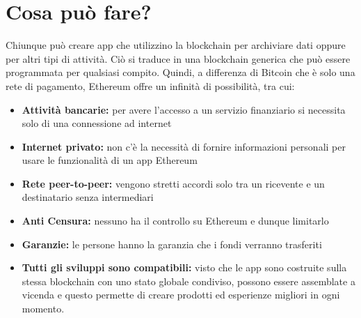 \documentclass[a4paper,11pt]{report}
\begin{document}
\section{Cosa può fare?}
Chiunque può creare app che utilizzino la blockchain per archiviare dati oppure per altri tipi di attività. Ciò si traduce in una blockchain generica che può essere programmata per qualsiasi compito. Quindi, a differenza di Bitcoin che è solo una rete di pagamento, Ethereum offre un infinità di possibilità, tra cui: 
\begin{itemize} %
\item \textbf{Attività bancarie:} per avere l'accesso a un servizio finanziario si necessita solo di una connessione ad internet
\item \textbf{Internet privato:} non c'è la necessità di fornire informazioni personali per usare le funzionalità di un app Ethereum
\item \textbf{Rete peer-to-peer:} vengono stretti accordi solo tra un ricevente e un destinatario senza intermediari
\item \textbf{Anti Censura:} nessuno ha il controllo su Ethereum e dunque limitarlo
\item \textbf{Garanzie:} le persone hanno la garanzia che i fondi verranno trasferiti
\item \textbf{Tutti gli sviluppi sono compatibili:} visto che le app sono costruite sulla stessa blockchain con uno stato globale condiviso, possono essere assemblate a vicenda e questo permette di creare prodotti ed esperienze migliori in ogni momento. 
\end{itemize}
\end{document}
